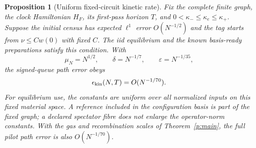 \documentclass[11pt,oneside,openany]{book}
\newtheorem{proposition}[theorem]{Proposition}
\theoremstyle{definition}
\theoremstyle{remark}\newtheorem{remark}[theorem]{Remark}
\begin{document}
\begin{proposition}[Uniform fixed-circuit kinetic rate]\label{p:kinetic-rate}
Fix the complete finite graph, the clock Hamiltonian $H_F$, its first-pass
horizon $T$, and $0<\kappa_-\le\kappa_e\le\kappa_+$.  Suppose the
initial census has expected $\ell^1$ error $O(N^{-1/2})$ and the tag starts
from $\nu\le Cw(0)$ with fixed $C$.  The iid equilibrium and the known
basis-ready preparations satisfy this condition.  With
\[
 \mu_N=N^{1/2},\qquad \delta=N^{-1/7},\qquad
 \varepsilon=N^{-1/35},
\]
the signed-queue path error obeys
\begin{equation}\label{p:explicit-rate}
 \epsilon_{\rm kin}(N,T)=O(N^{-1/70}).
\end{equation}
For equilibrium use, the constants are uniform over all normalized inputs
on this fixed material space.  A reference included in the configuration
basis is part of the fixed graph; a declared spectator fibre does not
enlarge the operator-norm constants.  With the gas and recombination scales
of Theorem~\ref{p:main}, the full pilot path error is also $O(N^{-1/70})$.
\end{proposition}
\end{document}
